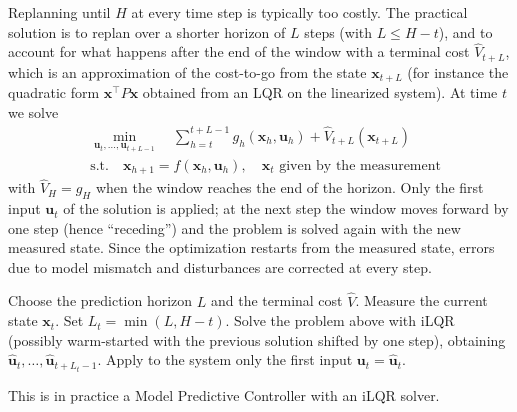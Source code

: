 \documentclass[10pt, a4paper]{report}
\begin{document}
Replanning until $H$ at every time step is typically too costly. The practical solution is to replan over a shorter horizon of $L$ steps (with $L\le H-t$), and to account for what happens after the end of the window with a terminal cost $\hat V_{t+L}$, which is an approximation of the cost-to-go from the state $\mathbf x_{t+L}$ (for instance the quadratic form $\mathbf x^\top P\mathbf x$ obtained from an LQR on the linearized system). At time $t$ we solve\begin{align}
    &\operatorname*{\min}_{ \mathbf u_t,\dots,\mathbf u_{t+L-1}}\quad \sum_{h=t}^{t+L-1}g_h(\mathbf x_h,\mathbf u_h)+\hat V_{t+L}(\mathbf x_{t+L})\\ 
    &\text{s.t.}\quad \mathbf x_{h+1}=f(\mathbf x_h,\mathbf u_h),\quad \mathbf x_t\text{ given by the measurement}
\end{align}
with $\hat V_H=g_H$ when the window reaches the end of the horizon. Only the first input $\mathbf u_t$ of the solution is applied; at the next step the window moves forward by one step (hence ``receding'') and the problem is solved again with the new measured state. Since the optimization restarts from the measured state, errors due to model mismatch and disturbances are corrected at every step.
\begin{algorithm}[H]
\caption{Model Predictive Control with an iLQR solver}\label{alg:MPC}
\begin{algorithmic}[1]
    \State Choose the prediction horizon $L$ and the terminal cost $\hat V$.
    \State Measure the current state $\mathbf x_t$.
    \State Set $L_t=\min(L,H-t)$.
    \State Solve the problem above with iLQR (possibly warm-started with the previous solution shifted by one step), obtaining $\hat{\mathbf u}_t,\dots,\hat{\mathbf u}_{t+L_t-1}$.
    \State Apply to the system only the first input $\mathbf u_t=\hat{\mathbf u}_t$.
    \EndFor
\end{algorithmic}
\end{algorithm}
\noindent This is in practice a Model Predictive Controller with an iLQR solver.
\end{document}
